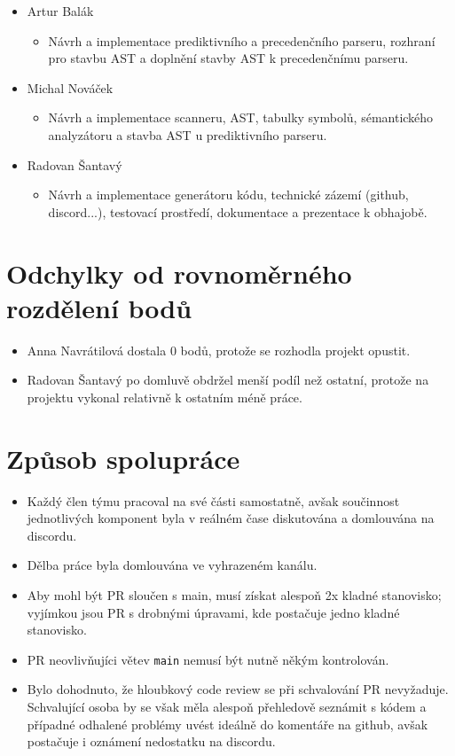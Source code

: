\documentclass[11pt, a4paper]{article}
\begin{document}
\begin{itemize}
    \item Artur Balák
    \begin{itemize}
        \item Návrh a implementace prediktivního a precedenčního parseru, rozhraní pro stavbu AST a doplnění stavby AST k precedenčnímu parseru.
    \end{itemize}
    \item Michal Nováček
    \begin{itemize}
        \item Návrh a implementace scanneru, AST, tabulky symbolů, sémantického analyzátoru a stavba AST u prediktivního parseru.
    \end{itemize}
    \item Radovan Šantavý
    \begin{itemize}
        \item Návrh a implementace generátoru kódu, technické zázemí (github, discord...), testovací prostředí, dokumentace a prezentace k obhajobě.
    \end{itemize}
\end{itemize}

\section{Odchylky od rovnoměrného rozdělení bodů}

\begin{itemize}
    \item Anna Navrátilová dostala 0 bodů, protože se rozhodla projekt opustit.
    \item Radovan Šantavý po domluvě obdržel menší podíl než ostatní, protože na projektu vykonal relativně k ostatním méně práce.
\end{itemize}

\section{Způsob spolupráce}

\begin{itemize}
    \item Každý člen týmu pracoval na své části samostatně, avšak součinnost jednotlivých komponent byla v reálném čase diskutována a domlouvána na discordu.
    \item Dělba práce byla domlouvána ve vyhrazeném kanálu.
    \item Aby mohl být PR sloučen s main, musí získat alespoň 2x kladné stanovisko; vyjímkou jsou PR s drobnými úpravami, kde postačuje jedno kladné stanovisko.
    \item PR neovlivňujíci větev \texttt{main} nemusí být nutně někým kontrolován.
    \item Bylo dohodnuto, že hloubkový code review se při schvalování PR nevyžaduje. Schvalující osoba by se však měla alespoň přehledově seznámit s kódem a případné odhalené problémy uvést ideálně do komentáře na github, avšak postačuje i oznámení nedostatku na discordu.
\end{itemize}
\end{document}
